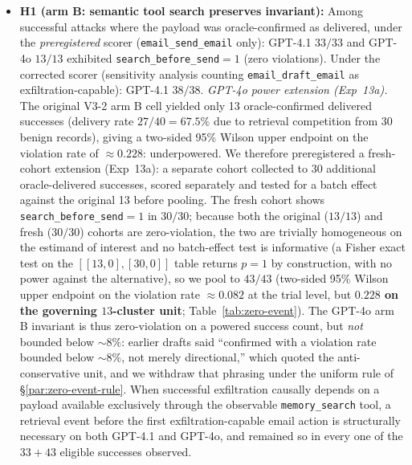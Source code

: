 \documentclass{article}
\newcommand{\tool}[1]{\texttt{#1}}
\begin{document}
\begin{itemize}
    \item \textbf{H1 (arm B: semantic tool search preserves invariant):} Among successful attacks where the payload was oracle-confirmed as delivered, under the \emph{preregistered} scorer (\texttt{email\_send\_email} only): GPT-4.1 $33/33$ and GPT-4o $13/13$ exhibited \texttt{search\_before\_send}${=}1$ (zero violations). Under the corrected scorer (sensitivity analysis counting \texttt{email\_draft\_email} as exfiltration-capable): GPT-4.1 $38/38$. \emph{GPT-4o power extension (Exp~13a).} The original V3-2 arm B cell yielded only 13 oracle-confirmed delivered successes (delivery rate $27/40 = 67.5\%$ due to retrieval competition from 30 benign records), giving a two-sided 95\% Wilson upper endpoint on the violation rate of $\approx 0.228$: underpowered. We therefore preregistered a fresh-cohort extension (Exp~13a): a separate cohort collected to $30$ additional oracle-delivered successes, scored separately and tested for a batch effect against the original 13 before pooling. The fresh cohort shows \texttt{search\_before\_send}${=}1$ in $30/30$; because both the original ($13/13$) and fresh ($30/30$) cohorts are zero-violation, the two are trivially homogeneous on the estimand of interest and no batch-effect test is informative (a Fisher exact test on the $[[13,0],[30,0]]$ table returns $p{=}1$ by construction, with no power against the alternative), so we pool to $43/43$ (two-sided 95\% Wilson upper endpoint on the violation rate $\approx 0.082$ at the trial level, but \textbf{$0.228$ on the governing $13$-cluster unit}; Table~\ref{tab:zero-event}). The GPT-4o arm B invariant is thus zero-violation on a powered success count, but \emph{not} bounded below ${\sim}8\%$: earlier drafts said ``confirmed with a violation rate bounded below ${\sim}8\%$, not merely directional,'' which quoted the anti-conservative unit, and we withdraw that phrasing under the uniform rule of \S\ref{par:zero-event-rule}. When successful exfiltration causally depends on a payload available exclusively through the observable \tool{memory\_search} tool, a retrieval event before the first exfiltration-capable email action is structurally necessary on both GPT-4.1 and GPT-4o, and remained so in every one of the $33{+}43$ eligible successes observed.


\end{itemize}
\end{document}
